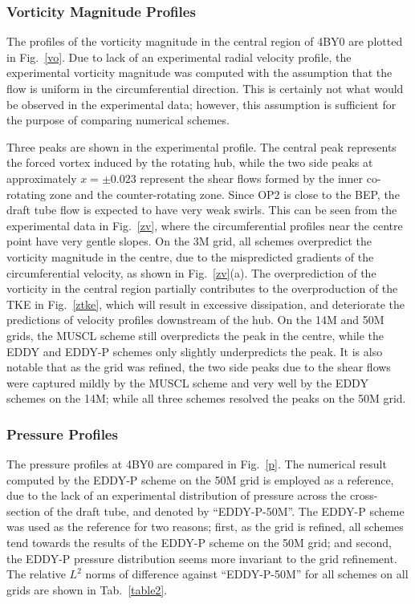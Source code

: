 \subsubsection{Vorticity Magnitude Profiles}
The profiles of the vorticity magnitude in the central region of 4BY0 are plotted in Fig.~\ref{vo}. Due to lack of an experimental radial velocity profile, the experimental vorticity magnitude was computed with the assumption that the flow is uniform in the circumferential direction. This is certainly not what would be observed in the experimental data; however, this assumption is sufficient for the purpose of comparing numerical schemes. 

Three peaks are shown in the experimental profile. The central peak represents the forced vortex induced by the rotating hub, while the two side peaks at approximately $x=\pm 0.023$ represent the shear flows formed by the inner co-rotating zone and the counter-rotating zone. Since OP2 is close to the BEP, the draft tube flow is expected to have very weak swirls. This can be seen from the experimental data in Fig.~\ref{zv}, where the circumferential profiles near the centre point have very gentle slopes. On the 3M grid, all schemes overpredict the vorticity magnitude in the centre, due to the mispredicted gradients of the circumferential velocity, as shown in Fig.~\ref{zv}(a). The overprediction of the vorticity in the central region partially contributes to the overproduction of the TKE in Fig.~\ref{ztke}, which will result in excessive dissipation, and deteriorate the predictions of velocity profiles downstream of the hub. On the 14M and 50M grids, the MUSCL scheme still overpredicts the peak in the centre, while the EDDY and EDDY-P schemes only slightly underpredicts the peak. It is also notable that as the grid was refined, the two side peaks due to the shear flows were captured mildly by the MUSCL scheme and very well by the EDDY schemes on the 14M; while all three schemes resolved the peaks on the 50M grid. 
\subsubsection{Pressure Profiles}
The pressure profiles at 4BY0 are compared in Fig.~\ref{p}. The numerical result computed by the EDDY-P scheme on the 50M grid is employed as a reference, due to the lack of an experimental distribution of pressure across the cross-section of the draft tube, and denoted by ``EDDY-P-50M''. The EDDY-P scheme was used as the reference for two reasons; first, as the grid is refined, all schemes tend towards the results of the EDDY-P scheme on the 50M grid; and second, the EDDY-P pressure distribution seems more invariant to the grid refinement. The relative $L^{2}$ norms of difference against ``EDDY-P-50M'' for all schemes on all grids are shown in Tab.~\ref{table2}. 

